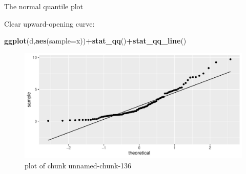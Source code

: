\documentclass[ignorenonframetext,]{beamer}
\newenvironment{Shaded}{\begin{snugshade}}{\end{snugshade}}
\newcommand{\DataTypeTok}[1]{\textcolor[rgb]{0.13,0.29,0.53}{#1}}
\newcommand{\KeywordTok}[1]{\textcolor[rgb]{0.13,0.29,0.53}{\textbf{#1}}}
\newcommand{\NormalTok}[1]{#1}
\newcommand{\OperatorTok}[1]{\textcolor[rgb]{0.81,0.36,0.00}{\textbf{#1}}}
\begin{document}
\begin{frame}[fragile]{The normal quantile plot}
\protect\hypertarget{the-normal-quantile-plot-4}{}

Clear upward-opening curve:

\begin{Shaded}
\begin{Highlighting}[]
\KeywordTok{ggplot}\NormalTok{(d,}\KeywordTok{aes}\NormalTok{(}\DataTypeTok{sample=}\NormalTok{x))}\OperatorTok{+}\KeywordTok{stat_qq}\NormalTok{()}\OperatorTok{+}\KeywordTok{stat_qq_line}\NormalTok{()}
\end{Highlighting}
\end{Shaded}

\begin{figure}
\centering
\includegraphics{figure/unnamed-chunk-136-1.pdf}
\caption{plot of chunk unnamed-chunk-136}
\end{figure}

\end{frame}
\end{document}
